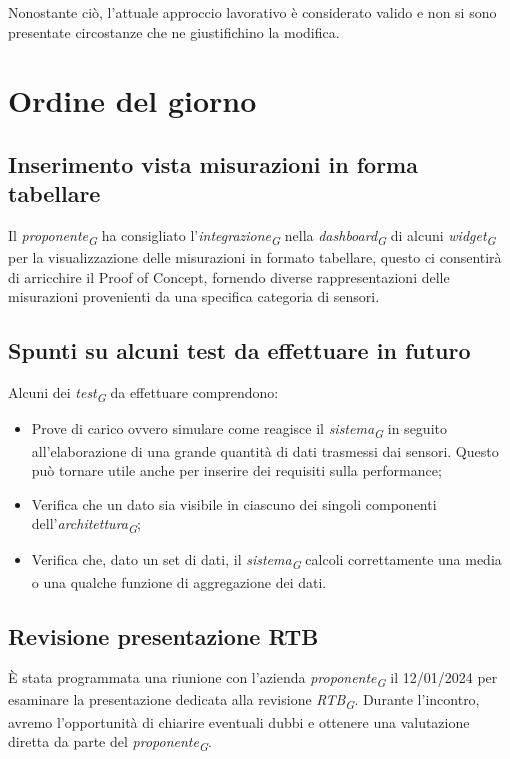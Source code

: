 \documentclass{article}
\begin{document}
Nonostante ciò, l'attuale approccio lavorativo è considerato valido e non si sono presentate circostanze che ne giustifichino la modifica.

\section{Ordine del giorno}
    \subsection{Inserimento vista misurazioni in forma tabellare}
    Il \textit{proponente}\textsubscript{\textit{G}} ha consigliato l'\textit{integrazione}\textsubscript{\textit{G}} nella \textit{dashboard}\textsubscript{\textit{G}} di alcuni \textit{widget}\textsubscript{\textit{G}} per la visualizzazione delle misurazioni in formato tabellare, questo ci consentirà di arricchire il Proof of Concept, fornendo diverse rappresentazioni delle misurazioni provenienti da una specifica categoria di sensori.

    \subsection{Spunti su alcuni test da effettuare in futuro}
    Alcuni dei \textit{test}\textsubscript{\textit{G}} da effettuare comprendono:
    \begin{itemize}
        \item Prove di carico ovvero simulare come reagisce il \textit{sistema}\textsubscript{\textit{G}} in seguito all'elaborazione di una grande quantità di dati trasmessi dai sensori. Questo può tornare utile anche per inserire dei requisiti sulla performance;
        \item Verifica che un dato sia visibile in ciascuno dei singoli componenti dell'\textit{architettura}\textsubscript{\textit{G}};
        \item Verifica che, dato un set di dati, il \textit{sistema}\textsubscript{\textit{G}} calcoli correttamente una media o una qualche funzione di aggregazione dei dati.
    \end{itemize}

    \subsection{Revisione presentazione RTB}
    È stata programmata una riunione con l'azienda \textit{proponente}\textsubscript{\textit{G}} il 12/01/2024 per esaminare la presentazione dedicata alla revisione \textit{RTB}\textsubscript{\textit{G}}. Durante l'incontro, avremo l'opportunità di chiarire eventuali dubbi e ottenere una valutazione diretta da parte del \textit{proponente}\textsubscript{\textit{G}}.
\end{document}
